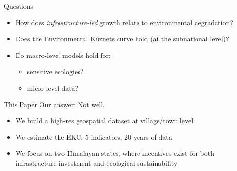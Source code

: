 \documentclass{beamer}
\begin{document}
    \begin{frame}{Questions}
        \begin{itemize}
            \item How does \textit{infrastructure-led} growth relate to environmental degradation?
            \item Does the Environmental Kuznets curve hold (at the subnational level)?
            \item Do macro-level models hold for: 
            \begin{itemize} %
                \item sensitive ecologies?
                \item micro-level data?
            \end{itemize}
        \end{itemize}
    \end{frame}

    \begin{frame}{This Paper}
        Our answer: Not well.\\[2em]

        \begin{itemize}
            \item We build a high-res geospatial dataset at village/town level
            \item We estimate the EKC: 5 indicators, 20 years of data
            \item We focus on two Himalayan states, where incentives exist for both infrastructure investment and ecological sustainability 
        \end{itemize}
    \end{frame}
\end{document}
